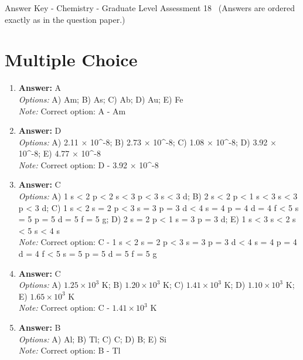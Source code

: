 \documentclass[12pt]{article}
\begin{document}
\begin{center}
Answer Key - Chemistry - Graduate Level Assessment 18 \
\small (Answers are ordered exactly as in the question paper.)
\end{center}

\section*{Multiple Choice}
\begin{enumerate}[label=\arabic*.]
\item \textbf{Answer:} A
\\ \textit{Options:} A) Am; B) As; C) Ab; D) Au; E) Fe
\\ \textit{Note:} Correct option: A - Am
\item \textbf{Answer:} D
\\ \textit{Options:} A) 2.11 \ensuremath{\times} 10^-8; B) 2.73 \ensuremath{\times} 10^-8; C) 1.08 \ensuremath{\times} 10^-8; D) 3.92 \ensuremath{\times} 10^-8; E) 4.77 \ensuremath{\times} 10^-8
\\ \textit{Note:} Correct option: D - 3.92 \ensuremath{\times} 10^-8
\item \textbf{Answer:} C
\\ \textit{Options:} A) 1 s \textless{} 2 p \textless{} 2 s \textless{} 3 p \textless{} 3 s \textless{} 3 d; B) 2 s \textless{} 2 p \textless{} 1 s \textless{} 3 s \textless{} 3 p \textless{} 3 d; C) 1 s \textless{} 2 s = 2 p \textless{} 3 s = 3 p = 3 d \textless{} 4 s = 4 p = 4 d = 4 f \textless{} 5 s = 5 p = 5 d = 5 f = 5 g; D) 2 s = 2 p \textless{} 1 s = 3 p = 3 d; E) 1 s \textless{} 3 s \textless{} 2 s \textless{} 5 s \textless{} 4 s
\\ \textit{Note:} Correct option: C - 1 s \textless{} 2 s = 2 p \textless{} 3 s = 3 p = 3 d \textless{} 4 s = 4 p = 4 d = 4 f \textless{} 5 s = 5 p = 5 d = 5 f = 5 g
\item \textbf{Answer:} C
\\ \textit{Options:} A) $1.25 \times 10^3$ $\mathrm{K}$; B) $1.20 \times 10^3$ $\mathrm{K}$; C) $1.41 \times 10^3$ $\mathrm{K}$; D) $1.10 \times 10^3$ $\mathrm{K}$; E) $1.65 \times 10^3$ $\mathrm{K}$
\\ \textit{Note:} Correct option: C - $1.41 \times 10^3$ $\mathrm{K}$
\item \textbf{Answer:} B
\\ \textit{Options:} A) Al; B) Tl; C) C; D) B; E) Si
\\ \textit{Note:} Correct option: B - Tl
\end{enumerate}
\end{document}
